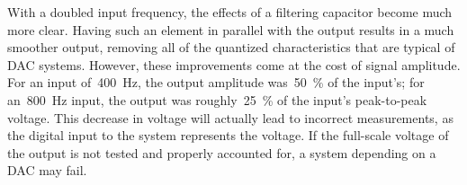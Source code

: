 %
With a doubled input frequency, the effects of a filtering capacitor become much more clear.  Having such an element in parallel with the output results in a much smoother output, removing all of the quantized characteristics that are typical of DAC systems.  However, these improvements come at the cost of signal amplitude.  For an input of~\SI{400}{\hertz}, the output amplitude was~\SI{50}{\percent} of the input's; for an~\SI{800}{\hertz} input, the output was roughly~\SI{25}{\percent} of the input's peak-to-peak voltage.  This decrease in voltage will actually lead to incorrect measurements, as the digital input to the system represents the voltage.  If the full-scale voltage of the output is not tested and properly accounted for, a system depending on a DAC may fail.
